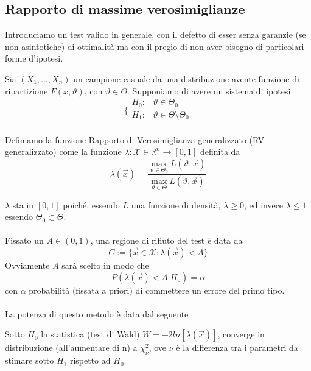 \subsection{Rapporto di massime verosimiglianze}

Introduciamo un test valido in generale, con il defetto di esser senza garanzie (se non asintotiche) di ottimalità ma con il pregio di non aver bisogno di particolari forme d'ipotesi. 

\begin{definizione}
Sia $(X_1,...,X_n)$ un campione casuale da una distribuzione avente funzione di ripartizione $F(x,\vartheta)$, con $\vartheta \in \Theta$.
Supponiamo di avere un sistema di ipotesi
$$\bigg \{
\begin{array}{rl}
H_0: & \vartheta \in \Theta_0 \\
H_1: & \vartheta \in \Theta \setminus \Theta_0 \\
\end{array}
$$

Definiamo la funzione Rapporto di Verosimiglianza generalizzato (RV generalizzato) come la funzione $\lambda: \mathcal{X} \in \mathbb{R}^n \to [0,1]$
definita da
$$\lambda(\vec{x}) = \frac{\max_{\vartheta \in \Theta_0} L(\vartheta,\vec{x})}{\max_{\vartheta \in \Theta} L(\vartheta,\vec{x})}$$
\end{definizione}

$\lambda$ sta in $[0,1]$ poiché, essendo $L$ una funzione di densità, $\lambda \geq 0$, ed invece $\lambda \leq 1$ essendo $\Theta_0 \subset \Theta$.\\
\\
Fissato un $A \in (0,1)$, una regione di rifiuto del test è data da 
$$C := \{ \vec{x} \in \mathcal{X}: \lambda(\vec{x})<A \}$$
Ovviamente $A$ sarà scelto in modo che 
$$P(\lambda(\vec{x})<A | H_0) = \alpha$$
con $\alpha$ probabilità (fissata a priori) di commettere un errore del primo tipo.\\
\\
La potenza di questo metodo è data dal seguente

\begin{teo}
Sotto $H_0$ la statistica (test di Wald) $W=-2ln[\lambda(\vec{x})]$, converge in distribuzione (all'aumentare di n) a $\chi^2_\nu$, ove $\nu$ è la differenza tra i parametri da stimare sotto $H_1$ rispetto ad $H_0$.
\end{teo}

